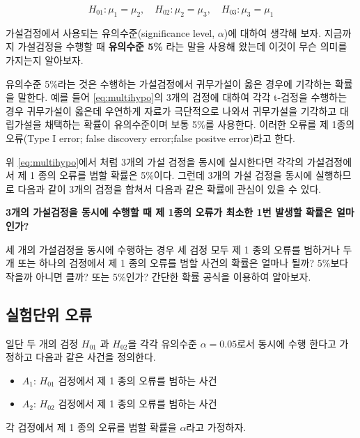 \documentclass[
]{book}
\providecommand{\tightlist}{%
  \setlength{\itemsep}{0pt}\setlength{\parskip}{0pt}}
\theoremstyle{definition}
\theoremstyle{definition}
\theoremstyle{definition}
\theoremstyle{definition}
\theoremstyle{remark}
\begin{document}
\begin{equation}
H_{01}: \mu_1 = \mu_2, \quad H_{02}: \mu_2 = \mu_3, \quad H_{03}: \mu_3 =\mu_1 
\label{eq:multihypo}
\end{equation}

가설검정에서 사용되는 유의수준(significance level, \(\alpha\))에 대하여
생각해 보자. 지금까지 가설검정을 수행할 때 \textbf{유의수준 5\%} 라는 말을
사용해 왔는데 이것이 무슨 의미를 가지는지 알아보자.

유의수준 5\%라는 것은 수행하는 가설검정에서 귀무가설이 옳은 경우에
기각하는 확률을 말한다. 예를 들어 \eqref{eq:multihypo}의 3개의 검정에
대하여 각각 t-검정을 수행하는 경우 귀무가설이 옳은데 우연하게 자료가
극단적으로 나와서 귀무가설을 기각하고 대립가설을 채택하는 확률이
유의수준이며 보통 5\%를 사용한다. 이러한 오류를 제 1종의 오류(Type I
error; false discovery error;false positve error)라고 한다.

위 \eqref{eq:multihypo}에서 처럼 3개의 가설 검정을 동시에 실시한다면
각각의 가설검정에서 제 1 종의 오류를 범할 확률은 5\%이다. 그런데 3개의
가설 검정을 동시에 실행하므로 다음과 같이 3개의 검정을 합쳐서 다음과
같은 확률에 관심이 있을 수 있다.

\textbf{3개의 가설검정을 동시에 수행할 때 제 1종의 오류가 최소한 1번 발생할
확률은 얼마인가?}

세 개의 가설검정을 동시에 수행하는 경우 세 검정 모두 제 1 종의 오류를
범하거나 두 개 또는 하나의 검정에서 제 1 종의 오류를 범할 사건의 확률은
얼마나 될까? 5\%보다 작을까 아니면 클까? 또는 5\%인가? 간단한 확률 공식을
이용하여 알아보자.

\hypertarget{uxc2e4uxd5d8uxb2e8uxc704-uxc624uxb958}{%
\subsection{실험단위 오류}\label{uxc2e4uxd5d8uxb2e8uxc704-uxc624uxb958}}

일단 두 개의 검정 \(H_{01}\) 과 \(H_{02}\)을 각각 유의수준 \(\alpha=0.05\)로서
동시에 수행 한다고 가정하고 다음과 같은 사건을 정의한다.

\begin{itemize}
\tightlist
\item
  \(A_1\): \(H_{01}\) 검정에서 제 1 종의 오류를 범하는 사건
\item
  \(A_2\): \(H_{02}\) 검정에서 제 1 종의 오류를 범하는 사건
\end{itemize}

각 검정에서 제 1 종의 오류를 범할 확률을 \(\alpha\)라고 가정하자.
\end{document}
